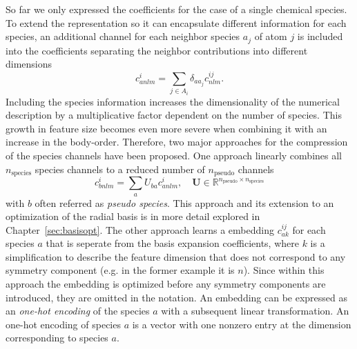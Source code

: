 So far we only expressed the coefficients for the case of a single chemical species.
To extend the representation so it can encapsulate different information for each species, an additional channel for each neighbor species $a_j$ of atom $j$ is included into the coefficients separating the neighbor contributions into different dimensions
\begin{equation}
  \label{eq:chemical_decomposition}
  c^{i}_{anlm} = \sum_{j\in A_i} \delta_{aa_j}c^{ij}_{nlm}.
\end{equation}
Including the species information increases the dimensionality of the numerical description by a multiplicative factor dependent on the number of species.
This growth in feature size becomes even more severe when combining it with an increase in the body-order.
Therefore, two major approaches for the compression of the species channels have been proposed.
One approach linearly combines all $n_{\text{species}}$ species channels to a reduced number of $n_{\text{pseudo}}$ channels~\cite{willatt2018feature,lopanitsyna2023modeling}
\begin{equation}
  \label{eq:pseudo_species}
  c^{i}_{bnlm} = \sum_a U_{ba}c^{i}_{anlm}, \quad \mathbf{U}\in\mathbb{R}^{n_\text{pseudo}\times n_\text{species}}
\end{equation}
with $b$ often referred as \emph{pseudo species}.
This approach and its extension to an optimization of the radial basis is in more detail explored in Chapter~\ref{sec:basisopt}.
The other approach learns a embedding $c^{ij}_{ak}$ for each species $a$ that is seperate from the basis expansion coefficients, where $k$ is a simplification to describe the feature dimension that does not correspond to any symmetry component (e.g. in the former example it is $n$).
Since within this approach the embedding is optimized before any symmetry components are introduced, they are omitted in the notation.
An embedding can be expressed as an \emph{one-hot encoding} of the species $a$ with a subsequent linear transformation.
An one-hot encoding of species $a$ is a vector with one nonzero entry at the dimension corresponding to species $a$.
